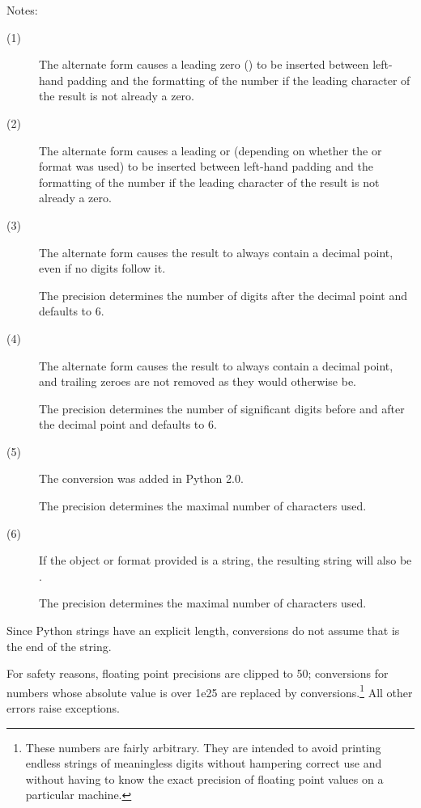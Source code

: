 \noindent
Notes:
\begin{description}
  \item[(1)]
    The alternate form causes a leading zero () to be
    inserted between left-hand padding and the formatting of the
    number if the leading character of the result is not already a
    zero.
  \item[(2)]
    The alternate form causes a leading  or 
    (depending on whether the  or  format
    was used) to be inserted between left-hand padding and the
    formatting of the number if the leading character of the result is
    not already a zero.
  \item[(3)]
    The alternate form causes the result to always contain a decimal
    point, even if no digits follow it.

    The precision determines the number of digits after the decimal
    point and defaults to 6.
  \item[(4)]
    The alternate form causes the result to always contain a decimal
    point, and trailing zeroes are not removed as they would
    otherwise be.

    The precision determines the number of significant digits before
    and after the decimal point and defaults to 6.
  \item[(5)]
    The  conversion was added in Python 2.0.

    The precision determines the maximal number of characters used.
  \item[(6)]
    If the object or format provided is a  string,
    the resulting string will also be .

    The precision determines the maximal number of characters used.
\end{description}


Since Python strings have an explicit length,  conversions
do not assume that  is the end of the string.

For safety reasons, floating point precisions are clipped to 50;
 conversions for numbers whose absolute value is over 1e25
are replaced by  conversions.\footnote{
  These numbers are fairly arbitrary.  They are intended to
  avoid printing endless strings of meaningless digits without hampering
  correct use and without having to know the exact precision of floating
  point values on a particular machine.
}  All other errors raise exceptions.

